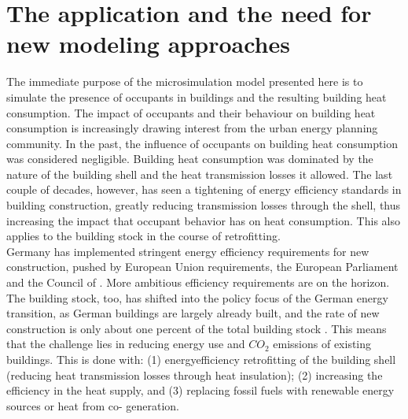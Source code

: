 \documentclass[11pt]{IJM-article}
\begin{document}

\section{The application and the need for new modeling approaches}
\label{sec:1}

The immediate purpose of the microsimulation model presented here is to
simulate the presence of occupants in buildings and the resulting building heat
consumption. The impact of occupants and their behaviour on building heat
consumption is increasingly drawing interest from the urban energy planning
community. In the past, the influence of occupants on building heat consumption
was considered negligible. Building heat consumption was dominated by the
nature of the building shell and the heat transmission losses it allowed. The
last couple of decades, however, has seen a tightening of energy efficiency
standards in building construction, greatly reducing transmission losses
through the shell, thus increasing the impact that occupant behavior has on
heat consumption. This also applies to the building stock in the course of
retrofitting.\\

Germany has implemented stringent energy efficiency requirements for new
construction, pushed by European Union requirements, the European Parliament
and the Council of .  More ambitious efficiency
requirements are on the horizon.  The building stock, too, has shifted into the
policy focus of the German energy transition, as German buildings are largely
already built, and the rate of new construction is only about one percent of
the total building stock .  This means that the challenge
lies in reducing energy use and $CO_{2}$ emissions of existing buildings.  This
is done with: (1) energyefficiency retrofitting of the building shell (reducing
heat transmission losses through heat insulation); (2) increasing the
efficiency in the heat supply, and (3) replacing fossil fuels with renewable
energy sources or heat from co- generation.\\
\end{document}
